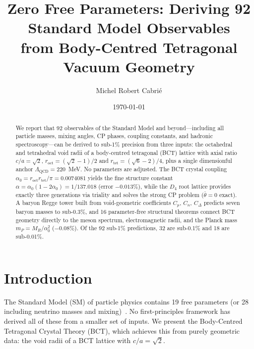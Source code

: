 \documentclass[aps,prl,reprint,superscriptaddress,showpacs]{revtex4-2}
\begin{document}
\title{Zero Free Parameters: Deriving 92 Standard Model Observables\\
from Body-Centred Tetragonal Vacuum Geometry}

\author{Michel Robert Cabri\'{e}}

\date{\today}

\newcommand{\myabstract}{%
We report that 92 observables of the Standard Model and beyond---including
all particle masses, mixing angles, CP phases, coupling constants, and
hadronic spectroscopy---can be derived to sub-1\% precision from three
inputs: the octahedral and tetrahedral void radii of a body-centred
tetragonal (BCT) lattice with axial ratio $c/a = \sqrt{2}$,
$r_{\mathrm{oct}} = (\sqrt{2}-1)/2$ and $r_{\mathrm{tet}} = (\sqrt{6}-2)/4$,
plus a single dimensionful anchor $\Lambda_{\mathrm{QCD}} = 220$~MeV.
No parameters are adjusted. The BCT crystal coupling
$\alpha_0 = r_{\mathrm{oct}} r_{\mathrm{tet}}/\pi = 0.0074081$
yields the fine structure constant $\alpha = \alpha_0(1-2\alpha_0) = 1/137.018$
(error $-0.013\%$), while the $D_4$ root lattice provides exactly three
generations via triality and solves the strong CP problem ($\bar{\theta}=0$ exact).
A baryon Regge tower built from void-geometric coefficients $C_p$, $C_n$,
$C_\Delta$ predicts seven baryon masses to sub-0.3\%, and 16 parameter-free
structural theorems connect BCT geometry directly to the meson spectrum,
electromagnetic radii, and the Planck mass $m_P = M_R/\alpha_0^2$ ($-0.08\%$).
Of the 92 sub-1\% predictions, 32 are sub-0.1\% and 18 are sub-0.01\%.%
}

\begin{abstract}
\myabstract
\end{abstract}

\maketitle

\section{Introduction}

The Standard Model (SM) of particle physics contains 19 free parameters
(or 28 including neutrino masses and mixing)~\cite{PDG2024}.
No first-principles framework has derived all of these from a smaller set
of inputs. We present the Body-Centred Tetragonal Crystal Theory (BCT),
which achieves this from purely geometric data: the void radii of a
BCT lattice with $c/a = \sqrt{2}$.
\end{document}
